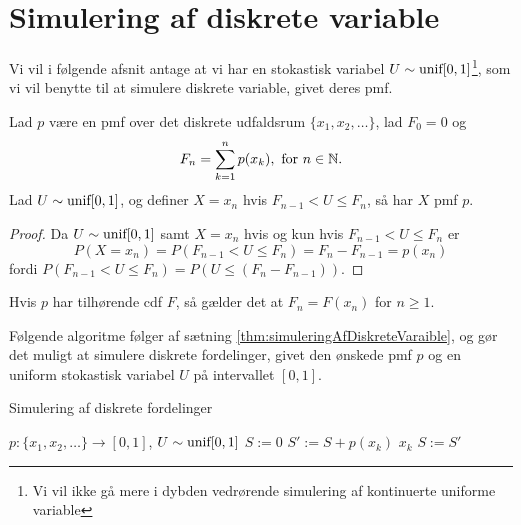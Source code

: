 \section{Simulering af diskrete variable}
Vi vil i følgende afsnit antage at vi har en stokastisk variabel $U \sim \textnormal{unif}[0,1]$\footnote{Vi vil ikke gå mere i dybden vedrørende simulering af kontinuerte uniforme variable}, som vi vil benytte til at simulere diskrete variable, givet deres pmf.
\begin{thm} \label{thm:simuleringAfDiskreteVaraible}
    Lad $p$ være en pmf over det diskrete udfaldsrum $\{x_1, x_2, \ldots\}$, lad $F_0 = 0$ og
    \begin{equation*}
        F_n = \sum^n_{k = 1} p(x_k), \text{ for } n \in \mathbb{N}.
    \end{equation*}
    Lad $U \sim \textnormal{unif}[0, 1]$, og definer $X = x_n$ hvis $F_{n - 1} < U \leq F_n$, så har $X$ pmf $p$.
\end{thm}

\begin{proof}
    Da $U \sim \textnormal{unif}[0, 1]$ samt $X = x_n$ hvis og kun hvis $F_{n - 1} < U \leq F_n$ er
    \begin{equation*}
        P(X = x_n) = P(F_{n - 1} < U \leq F_n) = F_n - F_{n - 1} = p(x_n)
    \end{equation*}
    fordi $P(F_{n - 1} < U \leq F_n) = P\left(U \leq (F_n - F_{n - 1})\right)$.
\end{proof}

\begin{rem}
Hvis $p$ har tilhørende cdf $F$, så gælder det at $F_n = F(x_n)$ for $n \geq 1$.
\end{rem}
Følgende algoritme følger af sætning \ref{thm:simuleringAfDiskreteVaraible}, og gør det muligt at simulere diskrete fordelinger, givet den ønskede pmf $p$ og en uniform stokastisk variabel $U$ på intervallet $[0, 1]$.

\begin{algorithm} 
\caption{Simulering af diskrete fordelinger}\label{alg:discreteSimulation} 
\begin{algorithmic}[1] 
 {$p: \{x_1, x_2, \ldots\} \rightarrow [0, 1]$, $U \sim \textnormal{unif}[0, 1]$}
    \State $S := 0$
        \State $S' := S + p(x_k)$ 
         \Return $x_k$
        \EndIf
        \State $S := S'$
    \EndFor
\EndProcedure
\end{algorithmic}
\end{algorithm} 



